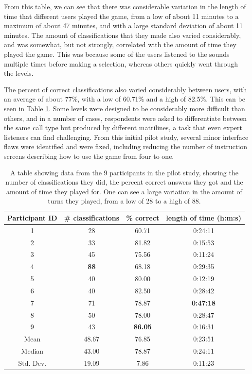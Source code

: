 From this table, we can see that there was considerable variation in
the length of time that different users played the game, from a low of
about 11 minutes to a maximum of about 47 minutes, and with a large
standard deviation of about 11 minutes.  The amount of classifications
that they made also varied considerably, and was somewhat, but not
strongly, correlated with the amount of time they played the game.  This
was because some of the users listened to the sounds multiple times
before making a selection, whereas others quickly went through the levels.

The percent of correct classifications also varied considerably
between users, with an average of about 77\%, with a low of 60.71\%
and a high of 82.5\%.  This can be seen in Table
\ref{table:pilotStudy}.  Some levels were designed to be considerably
more difficult than others, and in a number of cases, respondents were
asked to differentiate between the same call type but produced by
different matrilines, a task that even expert listeners can find
challenging.  From this initial pilot study, several minor interface
flaws were identified and were fixed, including reducing the number of
instruction screens describing how to use the game from four to one.

\begin{table}
\begin{tabular}{|c|c|c|c|}
\hline
Participant ID & \# classifications & \% correct & length of time (h:m:s) \\
\hline
1              &    28      &       60.71   &       0:24:11 \\                 
2              &    33      &       81.82   &       0:15:53 \\
3              &    45      &       75.56   &       0:11:24 \\
4              &    \textbf{88}      &       68.18   &       0:29:35 \\
5              &    40      &       80.00   &       0:12:19 \\
6              &    40      &       82.50   &       0:28:42 \\
7              &    71      &       78.87   &       \textbf{0:47:18} \\
8              &    50      &       78.00   &       0:28:47 \\
9              &    43      &       \textbf{86.05}   &       0:16:31 \\
\hline
Mean	       &    48.67	&       76.85	&       0:23:51 \\
Median	       &    43.00	&       78.87	&       0:24:11 \\
Std. Dev.	   &    19.09	&       7.86	&       0:11:23 \\
\hline
\end{tabular}
\caption{A table showing data from the 9 participants in the pilot
  study, showing the number of classifications they did, the percent
  correct answers they got and the amount of time they played for.
  One can see a large variation in the amount of turns they played,
  from a low of 28 to a high of 88.}
\label{table:pilotStudy}
\end{table}

